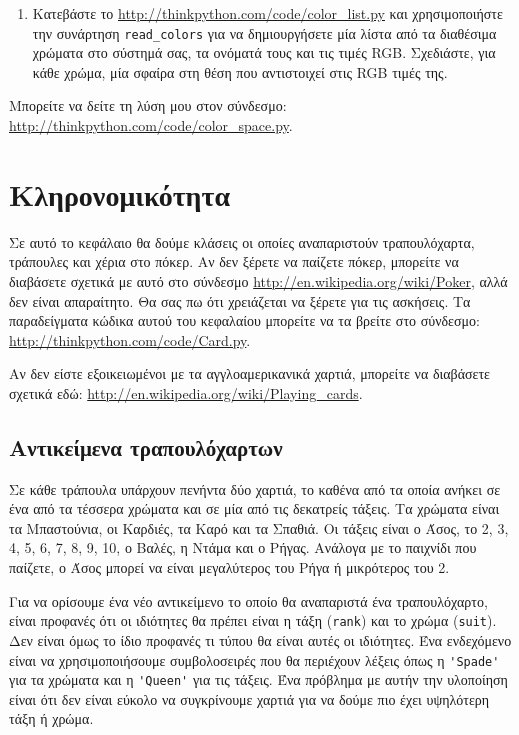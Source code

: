 \documentclass[10pt]{book}
\begin{document}
\begin{exercise}
\begin{enumerate}
\item Κατεβάστε το \url{http://thinkpython.com/code/color_list.py}
και χρησιμοποιήστε την συνάρτηση \verb"read_colors" για να δημιουργήσετε 
μία λίστα από τα διαθέσιμα χρώματα στο σύστημά σας, τα ονόματά τους και τις τιμές
RGB. Σχεδιάστε, για κάθε χρώμα, μία σφαίρα στη θέση που αντιστοιχεί στις
RGB τιμές της.


\end{enumerate}

Μπορείτε να δείτε τη λύση μου στον σύνδεσμο: \url{http://thinkpython.com/code/color_space.py}.

\end{exercise}


 
\chapter{Κληρονομικότητα}

Σε αυτό το κεφάλαιο θα δούμε κλάσεις οι οποίες αναπαριστούν τραπουλόχαρτα, τράπουλες και χέρια
στο πόκερ. Αν δεν ξέρετε να παίζετε πόκερ, μπορείτε να διαβάσετε σχετικά με αυτό στο σύνδεσμο
\url{http://en.wikipedia.org/wiki/Poker}, αλλά δεν είναι απαραίτητο. Θα σας πω ότι χρειάζεται να ξέρετε
για τις ασκήσεις. Τα παραδείγματα κώδικα αυτού του κεφαλαίου μπορείτε να τα βρείτε στο σύνδεσμο:
\url{http://thinkpython.com/code/Card.py}.

Αν δεν είστε εξοικειωμένοι με τα αγγλοαμερικανικά χαρτιά, μπορείτε να διαβάσετε σχετικά εδώ:
\url{http://en.wikipedia.org/wiki/Playing_cards}.


 
\section{Αντικείμενα τραπουλόχαρτων}

Σε κάθε τράπουλα υπάρχουν πενήντα δύο χαρτιά, το καθένα από τα οποία ανήκει σε ένα από τα τέσσερα χρώματα και
σε μία από τις δεκατρείς τάξεις. Τα χρώματα είναι τα Μπαστούνια, οι Καρδιές, τα Καρό και τα Σπαθιά. Οι τάξεις
είναι ο Άσος, το 2, 3, 4, 5, 6, 7, 8, 9, 10, ο Βαλές, η Ντάμα και ο Ρήγας. Ανάλογα με το παιχνίδι που παίζετε,
ο Άσος μπορεί να είναι μεγαλύτερος του Ρήγα ή μικρότερος του 2.

Για να ορίσουμε ένα νέο αντικείμενο το οποίο θα αναπαριστά ένα τραπουλόχαρτο, είναι προφανές ότι οι
ιδιότητες θα πρέπει είναι η τάξη ({\tt rank}) και το χρώμα ({\tt suit}). Δεν είναι όμως το ίδιο προφανές τι
τύπου θα είναι αυτές οι ιδιότητες. Ένα ενδεχόμενο είναι να χρησιμοποιήσουμε συμβολοσειρές που θα περιέχουν
λέξεις όπως η \verb"'Spade'" για τα χρώματα και η \verb"'Queen'" για τις τάξεις. Ένα πρόβλημα με αυτήν την
υλοποίηση είναι ότι δεν είναι εύκολο να συγκρίνουμε χαρτιά για να δούμε πιο έχει υψηλότερη τάξη ή χρώμα.
\end{document}
